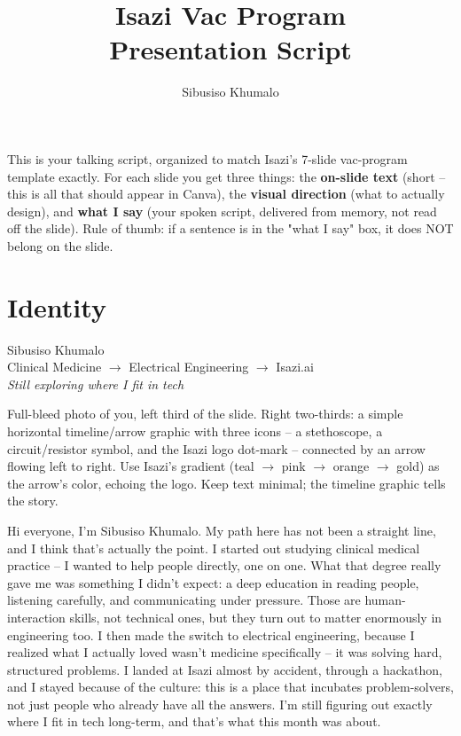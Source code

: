 \documentclass[11pt]{article}
\title{\color{isazipink}\Huge Isazi Vac Program\\\Large Presentation Script}
\author{Sibusiso Khumalo}
\date{}
\begin{document}
\maketitle

\begin{tcolorbox}[colback=isazipink!6,colframe=isazipink,title=HOW TO USE THIS DOCUMENT,fonttitle=\bfseries]
This is your talking script, organized to match Isazi's 7-slide vac-program template exactly.
For each slide you get three things: the \textbf{on-slide text} (short -- this is all that
should appear in Canva), the \textbf{visual direction} (what to actually design), and
\textbf{what I say} (your spoken script, delivered from memory, not read off the slide).
Rule of thumb: if a sentence is in the "what I say" box, it does NOT belong on the slide.
\end{tcolorbox}

\section{Identity}

\begin{onslide}
Sibusiso Khumalo\\
Clinical Medicine $\rightarrow$ Electrical Engineering $\rightarrow$ Isazi.ai\\
\textit{Still exploring where I fit in tech}
\end{onslide}

\begin{visual}
Full-bleed photo of you, left third of the slide. Right two-thirds: a simple horizontal
timeline/arrow graphic with three icons -- a stethoscope, a circuit/resistor symbol, and
the Isazi logo dot-mark -- connected by an arrow flowing left to right. Use Isazi's
gradient (teal $\to$ pink $\to$ orange $\to$ gold) as the arrow's color, echoing the logo.
Keep text minimal; the timeline graphic tells the story.
\end{visual}

\begin{scriptbox}
Hi everyone, I'm Sibusiso Khumalo. My path here has not been a straight line, and I think
that's actually the point. I started out studying clinical medical practice -- I wanted
to help people directly, one on one. What that degree really gave me was something I
didn't expect: a deep education in reading people, listening carefully, and communicating
under pressure. Those are human-interaction skills, not technical ones, but they turn out
to matter enormously in engineering too. I then made the switch to electrical engineering,
because I realized what I actually loved wasn't medicine specifically -- it was solving
hard, structured problems. I landed at Isazi almost by accident, through a hackathon,
and I stayed because of the culture: this is a place that incubates problem-solvers,
not just people who already have all the answers. I'm still figuring out exactly where
I fit in tech long-term, and that's what this month was about.
\end{scriptbox}
\end{document}
